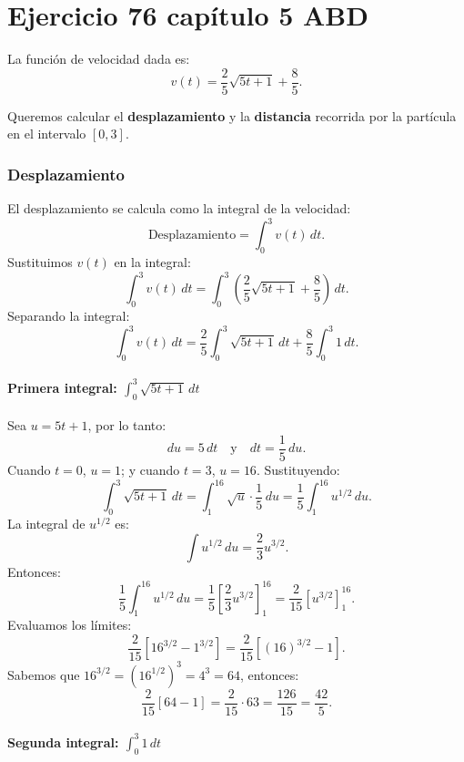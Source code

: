 \chapter*{Ejercicio 76 capítulo 5 ABD}

La función de velocidad dada es:
\[
v(t) = \frac{2}{5} \sqrt{5t + 1} + \frac{8}{5}.
\]

Queremos calcular el \textbf{desplazamiento} y la \textbf{distancia} recorrida por la partícula en el intervalo \( [0, 3] \).

\subsection*{Desplazamiento}

El desplazamiento se calcula como la integral de la velocidad:
\[
\text{Desplazamiento} = \int_{0}^{3} v(t) \, dt.
\]
Sustituimos \( v(t) \) en la integral:
\[
\int_{0}^{3} v(t) \, dt = \int_{0}^{3} \left( \frac{2}{5} \sqrt{5t + 1} + \frac{8}{5} \right) \, dt.
\]
Separando la integral:
\[
\int_{0}^{3} v(t) \, dt = \frac{2}{5} \int_{0}^{3} \sqrt{5t + 1} \, dt + \frac{8}{5} \int_{0}^{3} 1 \, dt.
\]

\subsubsection*{Primera integral: \( \int_{0}^{3} \sqrt{5t + 1} \, dt \)}

Sea \( u = 5t + 1 \), por lo tanto:
\[
du = 5 \, dt \quad \text{y} \quad dt = \frac{1}{5} \, du.
\]
Cuando \( t = 0 \), \( u = 1 \); y cuando \( t = 3 \), \( u = 16 \). Sustituyendo:
\[
\int_{0}^{3} \sqrt{5t + 1} \, dt = \int_{1}^{16} \sqrt{u} \cdot \frac{1}{5} \, du = \frac{1}{5} \int_{1}^{16} u^{1/2} \, du.
\]
La integral de \( u^{1/2} \) es:
\[
\int u^{1/2} \, du = \frac{2}{3} u^{3/2}.
\]
Entonces:
\[
\frac{1}{5} \int_{1}^{16} u^{1/2} \, du = \frac{1}{5} \left[ \frac{2}{3} u^{3/2} \right]_{1}^{16} = \frac{2}{15} \left[ u^{3/2} \right]_{1}^{16}.
\]
Evaluamos los límites:
\[
\frac{2}{15} \left[ 16^{3/2} - 1^{3/2} \right] = \frac{2}{15} \left[ (16)^{3/2} - 1 \right].
\]
Sabemos que \( 16^{3/2} = (16^{1/2})^3 = 4^3 = 64 \), entonces:
\[
\frac{2}{15} \left[ 64 - 1 \right] = \frac{2}{15} \cdot 63 = \frac{126}{15} = \frac{42}{5}.
\]

\subsubsection*{Segunda integral: \( \int_{0}^{3} 1 \, dt \)}

